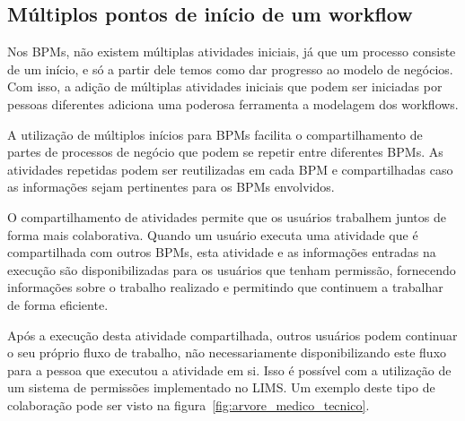 \subsection{Múltiplos pontos de início de um workflow}




Nos BPMs, não existem múltiplas atividades iniciais, já que um processo consiste de um início, e só a partir dele temos como dar progresso ao modelo de negócios. Com isso, a adição de múltiplas atividades iniciais que podem ser iniciadas por pessoas diferentes adiciona uma poderosa ferramenta a modelagem dos workflows.


A utilização de múltiplos inícios para BPMs facilita o compartilhamento de partes de processos de negócio que podem se repetir entre diferentes BPMs. As atividades repetidas podem ser reutilizadas em cada BPM e compartilhadas caso as informações sejam pertinentes para os BPMs envolvidos.

O compartilhamento de atividades permite que os usuários trabalhem juntos de forma mais colaborativa. Quando um usuário executa uma atividade que é compartilhada com outros BPMs, esta atividade e as informações entradas na execução são disponibilizadas para os usuários que tenham permissão, fornecendo informações sobre o trabalho realizado e permitindo que continuem a trabalhar de forma eficiente.

Após a execução desta atividade compartilhada, outros usuários podem continuar o seu próprio fluxo de trabalho, não necessariamente disponibilizando este fluxo para a pessoa que executou a atividade em si. Isso é possível com a utilização de um sistema de permissões implementado no LIMS. Um exemplo deste tipo de colaboração pode ser visto na figura~\ref{fig:arvore_medico_tecnico}.


